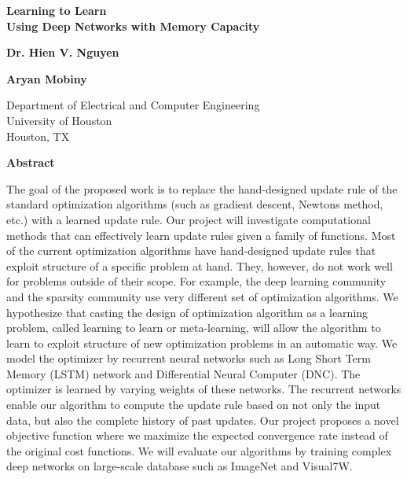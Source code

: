 \documentclass[a4paper, 11pt]{article}
\begin{document}
\begin{titlepage}
\begin{center}
\vspace*{1cm}
\textbf{\Huge{Learning to Learn}}\\
\vspace{0.5cm}
\textbf{\Large{Using Deep Networks with Memory Capacity}}
       
\vspace{2cm}
\textbf{Dr. Hien V. Nguyen}
        
\textbf{Aryan Mobiny}
        
\vspace{1cm}        
Department of Electrical and Computer Engineering\\
University of Houston\\
Houston, TX

\vspace{5cm}
\textbf{Abstract}
\end{center}
        
The goal of the proposed work is to replace the hand-designed update rule of the standard optimization algorithms (such as gradient descent, Newton\textsc{}s method, etc.) with a learned update rule. Our project will investigate computational methods that can effectively learn update rules given a family of functions. Most of the current optimization algorithms have hand-designed update rules that exploit structure of a specific problem at hand. They, however, do not work well for problems outside of their scope. For example, the deep learning community and the sparsity community use very different set of optimization algorithms. We hypothesize that casting the design of optimization algorithm as a learning problem, called learning to learn or meta-learning, will allow the algorithm to learn to exploit structure of new optimization problems in an automatic way. We model the optimizer by recurrent neural networks such as Long Short Term Memory (LSTM) network and Differential Neural Computer (DNC). The optimizer is learned by varying weights of these networks. The recurrent networks enable our algorithm to compute the update rule based on not only the input data, but also the complete history of past updates. Our project proposes a novel objective function where we maximize the expected convergence rate instead of the original cost functions. We will evaluate our algorithms by training complex deep networks on large-scale database such as ImageNet and Visual7W.

        
\end{titlepage}
\end{document}
